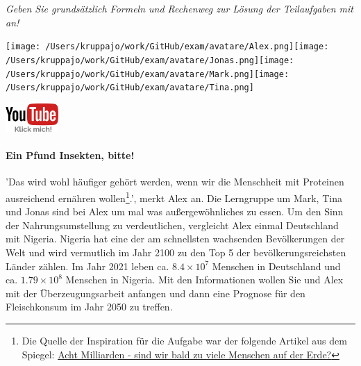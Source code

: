 \documentclass[a4paper, 9pt]{scrartcl}\usepackage[]{graphicx}\usepackage[]{xcolor}
\begin{document}
\textit{Geben Sie grundsätzlich Formeln und Rechenweg zur Lösung der Teilaufgaben mit an!} \\[1Ex]
 

 
\begin{minipage}[t]{0.5\textwidth}
\texttt{[image: /Users/kruppajo/work/GitHub/exam/avatare/Alex.png]}\hspace{-4mm}\texttt{[image: /Users/kruppajo/work/GitHub/exam/avatare/Jonas.png]}\hspace{-4mm}\texttt{[image: /Users/kruppajo/work/GitHub/exam/avatare/Mark.png]}\hspace{-4mm}\texttt{[image: /Users/kruppajo/work/GitHub/exam/avatare/Tina.png]}
\end{minipage}
\begin{minipage}[t]{0.5\textwidth}
\hfill
\href{https://youtu.be/OhyuH6hzEhY}{\includegraphics[width = 2cm]{img/youtube}}
\end{minipage}







\paragraph{Ein Pfund Insekten, bitte!} 'Das wird wohl häufiger gehört werden, wenn wir die Menschheit mit Proteinen ausreichend ernähren wollen\footnote{Die Quelle der Inspiration für die Aufgabe war der folgende Artikel aus dem Spiegel: \href{https://www.spiegel.de/ausland/ueberbevoelkerung-acht-milliarden-sind-wir-bald-zu-viele-menschen-auf-der-erde-a-3f20c7bc-3d60-4440-9f52-eb338db207f5}{Acht Milliarden - sind wir bald zu viele Menschen auf der Erde?}}.', merkt Alex an. Die Lerngruppe um Mark, Tina und Jonas sind bei Alex um mal was außergewöhnliches zu essen. Um den Sinn der Nahrungsumstellung zu verdeutlichen, vergleicht Alex einmal Deutschland mit Nigeria. Nigeria hat eine der am schnellsten wachsenden Bevölkerungen der Welt und wird vermutlich im Jahr 2100 zu den Top 5 der bevölkerungsreichsten Länder zählen. Im Jahr 2021 leben ca. \ensuremath{8.4\times 10^{7}} Menschen in Deutschland und ca. \ensuremath{1.79\times 10^{8}} Menschen in Nigeria. Mit den Informationen wollen Sie und Alex mit der Überzeugungsarbeit anfangen und dann eine Prognose für den Fleischkonsum im Jahr 2050 zu treffen. \\ 
\end{document}
